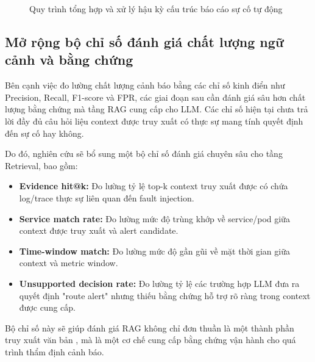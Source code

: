 \begin{figure}[htbp]
{
    }
    \vspace{0.3cm}
    \caption{Quy trình tổng hợp và xử lý hậu kỳ cấu trúc báo cáo sự cố tự động}
    \label{fig:rca_post_processing_flow}
\end{figure}
\subsection{Mở rộng bộ chỉ số đánh giá chất lượng ngữ cảnh và bằng chứng}

Bên cạnh việc đo lường chất lượng cảnh báo bằng các chỉ số kinh điển như Precision, Recall, F1-score và FPR, các giai đoạn sau cần đánh giá sâu hơn chất lượng bằng chứng mà tầng RAG cung cấp cho LLM. Các chỉ số hiện tại chưa trả lời đầy đủ câu hỏi liệu context được truy xuất có thực sự mang tính quyết định đến sự cố hay không.

Do đó, nghiên cứu sẽ bổ sung một bộ chỉ số đánh giá chuyên sâu cho tầng Retrieval, bao gồm:
\begin{itemize}
    \item \textbf{Evidence hit@k:} Đo lường tỷ lệ top-k context truy xuất được có chứa log/trace thực sự liên quan đến fault injection.
    \item \textbf{Service match rate:} Đo lường mức độ trùng khớp về service/pod giữa context được truy xuất và alert candidate.
    \item \textbf{Time-window match:} Đo lường mức độ gần gũi về mặt thời gian giữa context và metric window.
    \item \textbf{Unsupported decision rate:} Đo lường tỷ lệ các trường hợp LLM đưa ra quyết định "route alert" nhưng thiếu bằng chứng hỗ trợ rõ ràng trong context được cung cấp.
\end{itemize}

Bộ chỉ số này sẽ giúp đánh giá RAG không chỉ đơn thuần là một thành phần truy xuất văn bản , mà là một cơ chế cung cấp bằng chứng vận hành cho quá trình thẩm định cảnh báo.

